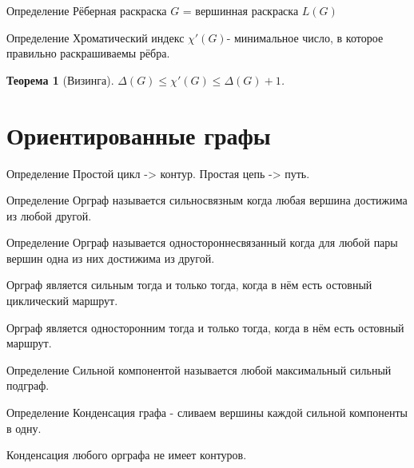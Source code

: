 \documentclass[a4paper,openany]{book}
\newcounter{TheoremCounter}
\newtheorem{theorem}[TheoremCounter]{Теорема}
\newenvironment{definition}
{\begin{statement}{Определение}}
    {\end{statement}}
\begin{document}
\begin{definition}
  Рёберная раскраска $G$ = вершинная раскраска $L(G)$
\end{definition}

\begin{definition}
  Хроматический индекс $\chi'(G)$- минимальное число, в которое правильно
  раскрашиваемы рёбра.
\end{definition}
\begin{theorem}[Визинга]
  $\Delta(G) \leqslant \chi'(G) \leqslant \Delta(G) + 1$.
\end{theorem}

\chapter{Ориентированные графы}
\begin{definition}
  Простой цикл -> контур. Простая цепь -> путь.
\end{definition}

\begin{definition}
   Орграф называется сильносвязным когда любая вершина достижима из любой другой.
\end{definition}

\begin{definition}
  Орграф называется одностороннесвязанный когда для любой пары вершин одна из
  них достижима из другой.
\end{definition}

\begin{stm}
  Орграф является сильным тогда и только тогда, когда в нём есть остовный
  циклический маршрут.
\end{stm}

\begin{stm}
  Орграф является односторонним тогда и только тогда, когда в нём есть
  остовный маршрут.
\end{stm}

\begin{definition}
  Сильной компонентой называется любой максимальный сильный подграф.
\end{definition}

\begin{definition}
  Конденсация графа - сливаем вершины каждой сильной компоненты в одну.
\end{definition}

\begin{stm}
  Конденсация любого орграфа не имеет контуров.
\end{stm}
\end{document}
